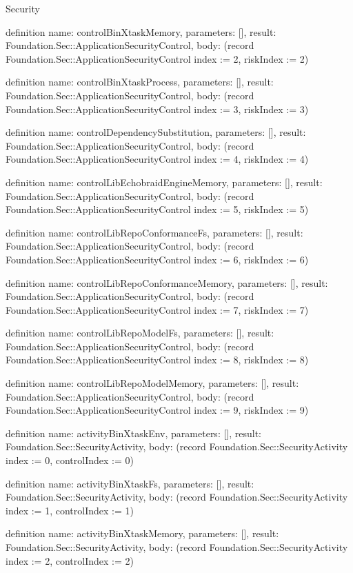 \begin{lexlean}{Security}
\begin{semanticmodule}
definition{
  name: controlBinXtaskMemory,
  parameters: [],
  result: Foundation.Sec::ApplicationSecurityControl,
  body: (record Foundation.Sec::ApplicationSecurityControl {index := 2, riskIndex := 2})
}

definition{
  name: controlBinXtaskProcess,
  parameters: [],
  result: Foundation.Sec::ApplicationSecurityControl,
  body: (record Foundation.Sec::ApplicationSecurityControl {index := 3, riskIndex := 3})
}

definition{
  name: controlDependencySubstitution,
  parameters: [],
  result: Foundation.Sec::ApplicationSecurityControl,
  body: (record Foundation.Sec::ApplicationSecurityControl {index := 4, riskIndex := 4})
}

definition{
  name: controlLibEchobraidEngineMemory,
  parameters: [],
  result: Foundation.Sec::ApplicationSecurityControl,
  body: (record Foundation.Sec::ApplicationSecurityControl {index := 5, riskIndex := 5})
}

definition{
  name: controlLibRepoConformanceFs,
  parameters: [],
  result: Foundation.Sec::ApplicationSecurityControl,
  body: (record Foundation.Sec::ApplicationSecurityControl {index := 6, riskIndex := 6})
}

definition{
  name: controlLibRepoConformanceMemory,
  parameters: [],
  result: Foundation.Sec::ApplicationSecurityControl,
  body: (record Foundation.Sec::ApplicationSecurityControl {index := 7, riskIndex := 7})
}

definition{
  name: controlLibRepoModelFs,
  parameters: [],
  result: Foundation.Sec::ApplicationSecurityControl,
  body: (record Foundation.Sec::ApplicationSecurityControl {index := 8, riskIndex := 8})
}

definition{
  name: controlLibRepoModelMemory,
  parameters: [],
  result: Foundation.Sec::ApplicationSecurityControl,
  body: (record Foundation.Sec::ApplicationSecurityControl {index := 9, riskIndex := 9})
}

definition{
  name: activityBinXtaskEnv,
  parameters: [],
  result: Foundation.Sec::SecurityActivity,
  body: (record Foundation.Sec::SecurityActivity {index := 0, controlIndex := 0})
}

definition{
  name: activityBinXtaskFs,
  parameters: [],
  result: Foundation.Sec::SecurityActivity,
  body: (record Foundation.Sec::SecurityActivity {index := 1, controlIndex := 1})
}

definition{
  name: activityBinXtaskMemory,
  parameters: [],
  result: Foundation.Sec::SecurityActivity,
  body: (record Foundation.Sec::SecurityActivity {index := 2, controlIndex := 2})
}


\end{semanticmodule}
\end{lexlean}
